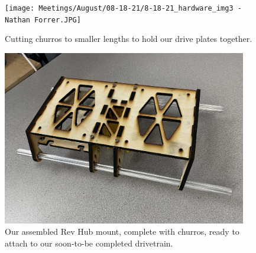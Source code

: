 \begin{figure}[ht]
\centering
\begin{minipage}[b]{.48\textwidth}
  \centering
  \texttt{[image: Meetings/August/08-18-21/8-18-21\_hardware\_img3 - Nathan Forrer.JPG]}
  \caption{Cutting churros to smaller lengths to hold our drive plates together.}
  \label{fig:081821_3}
\end{minipage}%
\hfill%
\begin{minipage}[b]{.48\textwidth}
  \centering
  \includegraphics[width=0.95\textwidth]{Meetings/August/08-18-21/8-18-21_hardware_img4 - Nathan Forrer.JPG}
  \caption{Our assembled Rev Hub mount, complete with churros, ready to attach to our soon-to-be completed drivetrain.}
  \label{fig:081821_4}
\end{minipage}
\end{figure}

